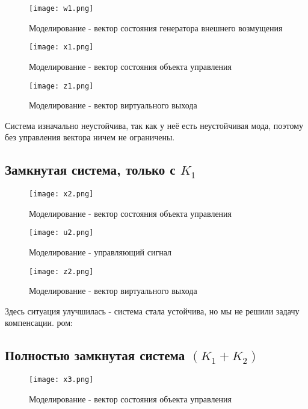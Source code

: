 \begin{figure}[ht]
  \centering
  \texttt{[image: w1.png]}
  \caption{Моделирование - вектор состояния генератора внешнего возмущения}
\end{figure}

\begin{figure}[ht]
  \centering
  \texttt{[image: x1.png]}
  \caption{Моделирование - вектор состояния объекта управления}
\end{figure}

\begin{figure}[ht]
  \centering
  \texttt{[image: z1.png]}
  \caption{Моделирование - вектор виртуального выхода}
\end{figure}

Система изначально неустойчива, так как у неё есть неустойчивая мода, поэтому без управления вектора ничем не ограничены.

\newpage
\subsection{Замкнутая система, только с $K_1$}


\begin{figure}[ht]
  \centering
  \texttt{[image: x2.png]}
  \caption{Моделирование - вектор состояния объекта управления}
\end{figure}

\begin{figure}[ht]
  \centering
  \texttt{[image: u2.png]}
  \caption{Моделирование - управляющий сигнал}
\end{figure}


\begin{figure}[ht]
  \centering
  \texttt{[image: z2.png]}
  \caption{Моделирование - вектор виртуального выхода}
\end{figure}

Здесь ситуация улучшилась - система стала устойчива, но мы не решили задачу компенсации.
ром:

\newpage
\subsection{Полностью замкнутая система $(K_1 + K_2)$}

\begin{figure}[ht]
  \centering
  \texttt{[image: x3.png]}
  \caption{Моделирование - вектор состояния объекта управления}
\end{figure}

